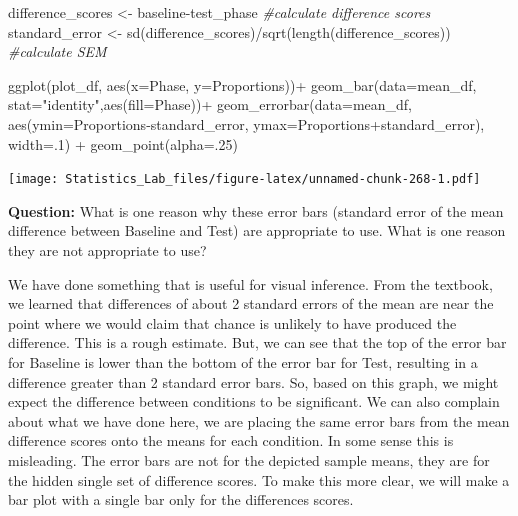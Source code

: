 \documentclass[
]{book}
\newenvironment{Shaded}{\begin{snugshade}}{\end{snugshade}}
\newcommand{\AttributeTok}[1]{\textcolor[rgb]{0.77,0.63,0.00}{#1}}
\newcommand{\CommentTok}[1]{\textcolor[rgb]{0.56,0.35,0.01}{\textit{#1}}}
\newcommand{\DecValTok}[1]{\textcolor[rgb]{0.00,0.00,0.81}{#1}}
\newcommand{\FunctionTok}[1]{\textcolor[rgb]{0.00,0.00,0.00}{#1}}
\newcommand{\NormalTok}[1]{#1}
\newcommand{\OtherTok}[1]{\textcolor[rgb]{0.56,0.35,0.01}{#1}}
\newcommand{\SpecialCharTok}[1]{\textcolor[rgb]{0.00,0.00,0.00}{#1}}
\newcommand{\StringTok}[1]{\textcolor[rgb]{0.31,0.60,0.02}{#1}}
\begin{document}
\begin{Shaded}
\begin{Highlighting}[]
\NormalTok{difference\_scores }\OtherTok{\textless{}{-}}\NormalTok{ baseline}\SpecialCharTok{{-}}\NormalTok{test\_phase }\CommentTok{\#calculate difference scores}
\NormalTok{standard\_error }\OtherTok{\textless{}{-}} \FunctionTok{sd}\NormalTok{(difference\_scores)}\SpecialCharTok{/}\FunctionTok{sqrt}\NormalTok{(}\FunctionTok{length}\NormalTok{(difference\_scores)) }\CommentTok{\#calculate SEM}


\FunctionTok{ggplot}\NormalTok{(plot\_df, }\FunctionTok{aes}\NormalTok{(}\AttributeTok{x=}\NormalTok{Phase, }\AttributeTok{y=}\NormalTok{Proportions))}\SpecialCharTok{+} 
  \FunctionTok{geom\_bar}\NormalTok{(}\AttributeTok{data=}\NormalTok{mean\_df, }\AttributeTok{stat=}\StringTok{"identity"}\NormalTok{,}\FunctionTok{aes}\NormalTok{(}\AttributeTok{fill=}\NormalTok{Phase))}\SpecialCharTok{+}
  \FunctionTok{geom\_errorbar}\NormalTok{(}\AttributeTok{data=}\NormalTok{mean\_df, }\FunctionTok{aes}\NormalTok{(}\AttributeTok{ymin=}\NormalTok{Proportions}\SpecialCharTok{{-}}\NormalTok{standard\_error, }
                                  \AttributeTok{ymax=}\NormalTok{Proportions}\SpecialCharTok{+}\NormalTok{standard\_error), }\AttributeTok{width=}\NormalTok{.}\DecValTok{1}\NormalTok{) }\SpecialCharTok{+}
  \FunctionTok{geom\_point}\NormalTok{(}\AttributeTok{alpha=}\NormalTok{.}\DecValTok{25}\NormalTok{)}
\end{Highlighting}
\end{Shaded}

\texttt{[image: Statistics\_Lab\_files/figure-latex/unnamed-chunk-268-1.pdf]}

\textbf{Question:} What is one reason why these error bars (standard error of the mean difference between Baseline and Test) are appropriate to use. What is one reason they are not appropriate to use?

We have done something that is useful for visual inference. From the textbook, we learned that differences of about 2 standard errors of the mean are near the point where we would claim that chance is unlikely to have produced the difference. This is a rough estimate. But, we can see that the top of the error bar for Baseline is lower than the bottom of the error bar for Test, resulting in a difference greater than 2 standard error bars. So, based on this graph, we might expect the difference between conditions to be significant. We can also complain about what we have done here, we are placing the same error bars from the mean difference scores onto the means for each condition. In some sense this is misleading. The error bars are not for the depicted sample means, they are for the hidden single set of difference scores. To make this more clear, we will make a bar plot with a single bar only for the differences scores.
\end{document}
